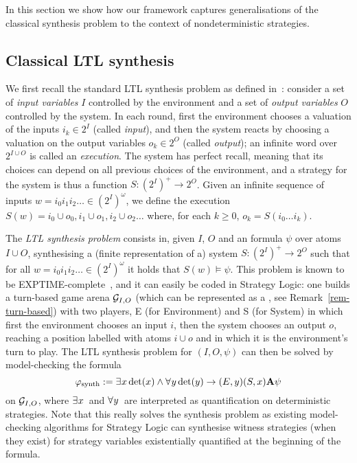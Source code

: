 In this section we show how our framework captures generalisations of
the classical \LTL synthesis problem to the context of nondeterministic strategies.

\subsection{Classical LTL synthesis}
\label{sec-ltl-synth}

We first recall the standard LTL synthesis problem as defined
in~\cite{pnueli1989synthesisshort}: consider a set of \emph{input
  variables} $I$ controlled by the environment and a set of
\emph{output variables} $O$ controlled by the system. In each round,
first the environment chooses a valuation of the inputs $i_k\in 2^I$
(called \emph{input}), and then the system reacts by choosing a
valuation on the output variables $o_k\in 2^O$ (called \emph{output});
an infinite word over $2^{I\cup O}$ is called an
\emph{execution}. The system has perfect recall, meaning that its
choices can depend on all previous choices of the environment, and a
strategy for the system is thus a function $S:(2^I)^+\to 2^O$. Given
an infinite sequence of inputs $w=i_0i_1i_2\ldots \in (2^I)^\omega$, we
define the execution $S(w)=i_0\cup o_0, i_1\cup o_1, i_2\cup o_2\ldots$ where,
for each $k\geq 0$, $o_k=S(i_0\ldots i_k)$.

The \emph{LTL synthesis problem} consists in,
given $I$, $O$ and an \LTL formula $\psi$ over atoms $I\cup O$,
synthesising a (finite representation of a) system $S:(2^I)^+\to 2^O$ such
that for all $w=i_0i_1i_2\ldots\in (2^I)^\omega$ it holds that $S(w)\models\psi$.
This problem is known to be
\2EXPTIME-complete~\cite{pnueli1989synthesisshort}, and it can easily
be coded in Strategy Logic: one builds a turn-based game arena $\CGS_{I,O}$ (which
can be represented as a \CGS, see Remark~\ref{rem-turn-based}) with
two players, E (for Environment) and S (for System) in
which first the environment chooses an input $i$, then the system chooses
an output $o$, reaching a position labelled with atoms $i\cup o$ and in which it is
the environment's turn to play. The LTL synthesis problem for $(I,O,\psi)$ can
then be solved by model-checking the \SL formula
\[\phisynth:=\Estratnd \phidet \wedge   \Astratnd[\varb]
  \phidet[\varb] \rightarrow (E,\varb)(S,\var) \A \psi\]
on $\CGS_{I,O}$, where $\Estratnd$ and $\Astratnd[\varb]$ are interpreted as
quantification on deterministic strategies. Note that this really solves the synthesis
problem as existing model-checking algorithms for Strategy Logic can
synthesise  witness strategies (when they exist) for strategy variables existentially
quantified at the beginning of the formula.

